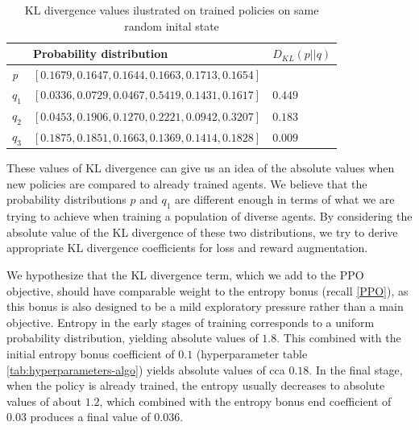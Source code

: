 \begin{table}[htbp]
    \small
    \centering
    \begin{tabular}{lll}
      \toprule
      \                                & Probability distribution     & $D_{KL}(p||q)$         \\ \midrule
      \textit{p}     &$[0.1679, 0.1647, 0.1644, 0.1663, 0.1713, 0.1654]$                                   &                                   \\ \midrule            
      $q_1$                     & $[0.0336, 0.0729, 0.0467, 0.5419, 0.1431, 0.1617]$                            & $0.449$                            \\
      $q_2$                         & $[0.0453, 0.1906, 0.1270, 0.2221, 0.0942, 0.3207]$                            & $0.183$                            \\
      $q_3$                                & $[0.1875, 0.1851, 0.1663, 0.1369, 0.1414, 0.1828]$                         & $0.009$                               \\
      
     \bottomrule
    \end{tabular}
    \caption{KL divergence values ilustrated on trained policies on same random inital state}
    \label{tab:KLDiv-distributions}
\end{table}

These values of KL divergence can give us an idea of the absolute values when new policies are compared to already trained agents.
We believe that the probability distributions $p$ and $q_1$ are different enough in terms of what we are trying to achieve when training a population of diverse agents.
By considering the absolute value of the KL divergence of these two distributions, we try to derive appropriate KL divergence coefficients for loss and reward augmentation.

We hypothesize that the KL divergence term, which we add to the PPO objective, should have comparable weight to the entropy bonus (recall \ref{PPO}), as this bonus is also designed to be a mild exploratory pressure rather than a main objective.
Entropy in the early stages of training corresponds to a uniform probability distribution, yielding absolute values of $1.8$. 
This combined with the initial entropy bonus coefficient of $0.1$ (hyperparameter table \ref{tab:hyperparameters-algo}) yields absolute values of cca $0.18$.
In the final stage, when the policy is already trained, the entropy usually decreases to absolute values of about $1.2$, which combined with the entropy bonus end coefficient of $0.03$ produces a final value of $0.036$.

